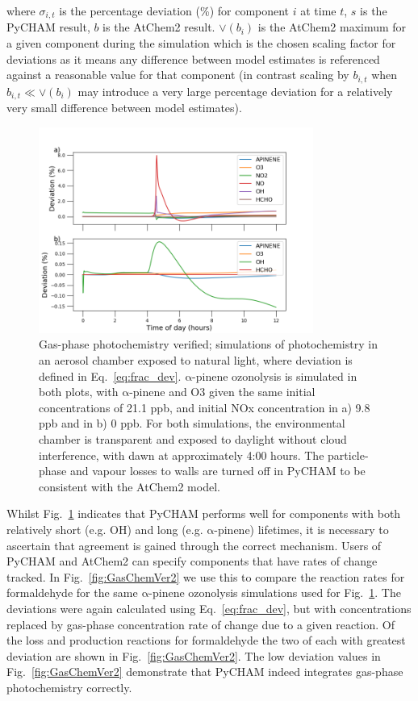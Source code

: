 \documentclass[gmd, manuscript]{copernicus}
\begin{document}
where $\sigma_{i,t}$ is the percentage deviation (\%) for component $i$ at time $t$, $s$ is the PyCHAM result, $b$ is the AtChem2 result.  $\lor(b_{i})$ is the AtChem2 maximum for a given component during the simulation which is the chosen scaling factor for deviations as it means any difference between model estimates is referenced against a reasonable value for that component (in contrast scaling by $b_{i,t}$ when $b_{i,t} \ll \lor(b_{i})$ may introduce a very large percentage deviation for a relatively very small difference between model estimates).

\begin{figure}[t]
\includegraphics[width=9.0cm]{Results/photo_chem_conc_dev.png}
\caption{Gas-phase photochemistry verified; simulations of photochemistry in an aerosol chamber exposed to natural light, where deviation is defined in Eq.~\ref{eq:frac_dev}.  $\mathrm{\alpha}$-pinene ozonolysis is simulated in both plots, with $\mathrm{\alpha}$-pinene and O3 given the same initial concentrations of 21.1 ppb, and initial NOx concentration in a) 9.8 ppb and in b) 0 ppb.  For both simulations, the environmental chamber is transparent and exposed to daylight without cloud interference, with dawn at approximately 4:00 hours.  The particle-phase and vapour losses to walls are turned off in PyCHAM to be consistent with the AtChem2 model.}
\label{fig:GasChemVer1}
\end{figure}

Whilst Fig.~\ref{fig:GasChemVer1} indicates that PyCHAM performs well for components with both relatively short (e.g. OH) and long (e.g. $\mathrm{\alpha}$-pinene) lifetimes, it is necessary to ascertain that agreement is gained through the correct mechanism.  Users of PyCHAM and AtChem2 can specify components that have rates of change tracked.  In Fig.~\ref{fig:GasChemVer2} we use this to compare the reaction rates for formaldehyde for the same $\mathrm{\alpha}$-pinene ozonolysis simulations used for Fig.~\ref{fig:GasChemVer1}.  The deviations were again calculated using Eq.~\ref{eq:frac_dev}, but with concentrations replaced by gas-phase concentration rate of change due to a given reaction.  Of the loss and production reactions for formaldehyde the two of each with greatest deviation are shown in Fig.~\ref{fig:GasChemVer2}.  The low deviation values in Fig.~\ref{fig:GasChemVer2} demonstrate that PyCHAM indeed integrates gas-phase photochemistry correctly.
\end{document}
